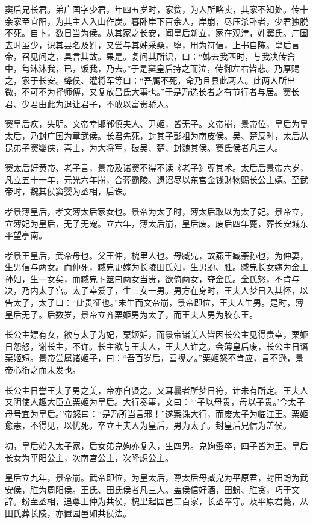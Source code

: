 \documentclass[]{article}
\begin{document}
窦后兄长君。弟广国字少君，年四五岁时，家贫，为人所略卖，其家不知处。传十余家至宜阳，为其主人入山作炭。暮卧岸下百余人，岸崩，尽压杀卧者，少君独脱不死。自卜，数日当为侯。从其家之长安，闻皇后新立，家在观津，姓窦氏。广国去时虽少，识其县名及姓，又尝与其姊采桑，堕，用为符信，上书自陈。皇后言帝，召见问之，具言其故。果是。复问其所识，曰：``姊去我西时，与我决传舍中，匄沐沐我，已，饭我，乃去。''于是窦皇后持之而泣，侍御左右皆悲。乃厚赐之，家于长安。绛侯、灌将军等曰：``吾属不死，命乃且县此两人。此两人所出微，不可不为择师傅，又复放吕氏大事也。''于是乃选长者之有节行者与居。窦长君、少君由此为退让君子，不敢以富贵骄人。

窦皇后疾，失明。文帝幸邯郸慎夫人、尹姬，皆无子。文帝崩，景帝位，皇后为皇太后，乃封广国为章武侯。长君先死，封其子彭祖为南皮侯。吴、楚反时，太后从昆弟子窦婴侠，喜士，为大将军，破吴、楚、封魏其侯。窦氏侯者凡三人。

窦太后好黄帝、老子言，景帝及诸窦不得不读《老子》尊其术。太后后景帝六岁，凡立五十一年，元光六年崩，合葬霸陵。遗诏尽以东宫金钱财物赐长公主嫖。至武帝时，魏其侯窦婴为丞相，后诛。

孝景薄皇后，孝文薄太后家女也。景帝为太子时，薄太后取以为太子妃。景帝立，立薄妃为皇后，无子无宠。立六年，薄太后崩，皇后废。废后四年薨，葬长安城东平望亭南。

孝景王皇后，武帝母也。父王仲，槐里人也。母臧皃，故燕王臧荼孙也，为仲妻，生男信与两女。而仲死，臧皃更嫁为长陵田氏妇，生男蚡、胜。臧皃长女嫁为金王孙妇，生一女矣，而臧皃卜筮曰两女当贵，欲倚两女，夺金氏。金氏怒，不肯与决，乃内太子宫。太子幸爱子，生三女一男。男方在身时，王夫人梦日入其怀，以告太子，太子曰：``此贵征也。''未生而文帝崩，景帝即位，王夫人生男。是时，薄皇后无子。后数岁，景帝立齐栗姬男为太子，而王夫人男为胶东王。

长公主嫖有女，欲与太子为妃，栗姬妒，而景帝诸美人皆因长公主见得贵幸，栗姬日怨怒，谢长主，不许。长主欲与王夫人，王夫人许之。会薄皇后废，长公主日谮栗姬短。景帝尝属诸姬子，曰：``吾百岁后，善视之。''栗姬怒不肯应，言不逊，景帝心衔之而未发也。

长公主日誉王夫子男之美，帝亦自贤之。又耳曩者所梦日符，计未有所定。王夫人又阴使人趣大臣立栗姬为皇后。大行奏事，文曰：```子以母贵，母以子贵。'今太子母号宜为皇后。''帝怒曰：``是乃所当言邪！''遂案诛大行，而废太子为临江王。栗姬愈恚，不得见，以忧死。卒立王夫人为皇后，男为太子。封皇后兄信为盖侯。

初，皇后始入太子家，后女弟皃姁亦复入，生四男。皃姁蚤卒，四子皆为王。皇后长女为平阳公主，次南宫公主，次隆虑公主。

皇后立九年，景帝崩。武帝即位，为皇太后，尊太后母臧皃为平原君，封田蚡为武安侯，胜为周阳侯。王氏、田氏侯者凡三人。盖侯信好酒，田蚡、胜贪，巧于文辞。蚡至丞相，追尊王仲为共侯，槐里起园邑二百家，长丞奉守。及平原君薨，从田氏葬长陵，亦置园邑如共侯法。
\end{document}
